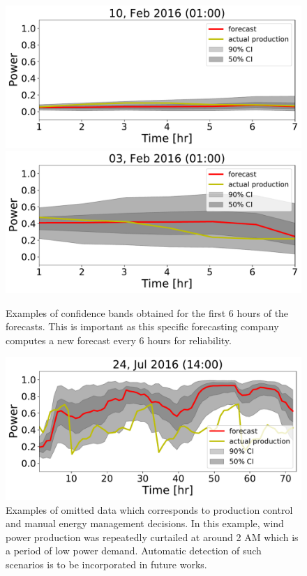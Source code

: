 \documentclass[10pt,twocolumn,letterpaper]{article}
\begin{document}
\begin{figure}[t]
\begin{center}
   \includegraphics[width=0.8\linewidth]{6hr_forecast_CI_75.pdf}  %
   \includegraphics[width=0.8\linewidth]{6hr_forecast_CI_59.pdf}
\end{center}
   \caption{ Examples of confidence bands obtained for the first 6 hours of the forecasts. This is important as this specific forecasting company computes a new forecast every 6 hours for reliability.}
\label{fig:6hr}
\end{figure}
 
 
 \begin{figure}[t]
\begin{center}
   \includegraphics[width=0.8\linewidth]{72hr_forecast_CI_623.pdf}  %
\end{center}
   \caption{ Examples of omitted data which corresponds to production control and manual energy management decisions. In this example,  wind power production was repeatedly curtailed at around 2 AM which is a period of low power demand. Automatic detection of such scenarios is to be incorporated in future works.}
\label{fig:6hr}
\end{figure}
\end{document}
